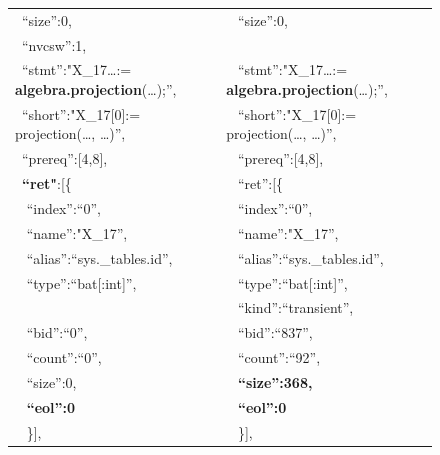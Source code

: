 \documentclass[conference]{IEEEtran}
\begin{document}
\begin{figure}[t]
{\begin{tabular}{|l@{~}l|}
 ~``size'':0,                                             &   ~ ``size'':0,                                              \\
 ~{\color{red}``nvcsw'':1,}                               &   ~                                                          \\
 ~``stmt'':"X\_17…:= \textbf{algebra.projection}(…);'',   &   ~ ``stmt'':"X\_17…:= \textbf{algebra.projection}(…);'',    \\
 ~``short'':"X\_17[0]:= projection(…, …)'',               &   ~ ``short'':"X\_17[0]:= projection(…, …)'',                \\
 ~``prereq'':[4,8],                                       &   ~ ``prereq'':[4,8],                                        \\
 ~\textbf{``ret"}:[\{                                     &   ~ ``ret'':[\{                                              \\
 ~   ``index'':``0'',                                     &   ~    ``index'':``0'',                                      \\
 ~   ``name'':"X\_17'',                                   &   ~    ``name'':"X\_17'',                                    \\
 ~   ``alias'':``sys.\_tables.id'',                       &   ~    ``alias'':``sys.\_tables.id'',                        \\
 ~   ``type'':``bat[:int]'',                              &   ~    ``type'':``bat[:int]'',                               \\
 ~                                                        &   ~ {\color{red}``kind'':``transient'',}                     \\
 ~   {\color{red}``bid'':``0'',}                          &   ~    {\color{red}``bid'':``837'',}                         \\
 ~   {\color{red}``count'':``0'',}                        &   ~    {\color{red}``count'':``92'',}                        \\
 ~   {\color{red}``size'':0,}                             &   ~    \textbf{\color{red}``size'':368,}                     \\
 ~   \textbf{``eol'':0}                                   &   ~    \textbf{``eol'':0}                                    \\
 ~  \}],                                                  &   ~   \}],                                                   \\

\end{tabular}}
\end{figure}
\end{document}
